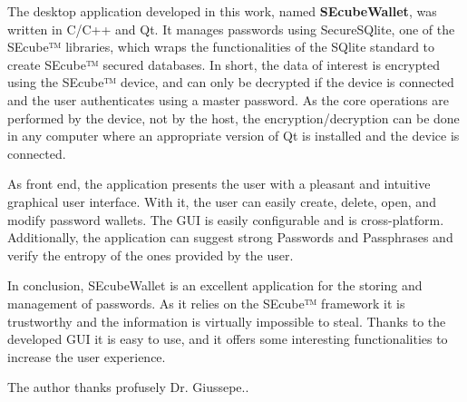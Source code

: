 \documentclass[%
    corpo=13pt,
    twoside,
    oldstyle,
    autoretitolo,
    greek,
    evenboxes,
    numerazioneromana,
    tipotesi=magistrale,
]{toptesi}
\begin{document}
The desktop application developed in this work, named \textbf{SEcubeWallet}, was written in C/C++ and Qt. 
It manages passwords using SecureSQlite, one of the SEcube™ libraries, which wraps the functionalities of the SQlite standard to create SEcube™ secured databases. In short, the data of interest is encrypted using the SEcube™ device, and can only be decrypted if the device is connected and the user authenticates using a master password. 
As the core operations are performed by the device, not by the host, the encryption/decryption can be done in any computer where an appropriate version of Qt is installed and the device is connected.

As front end, the application presents the user with a pleasant and intuitive graphical user interface. With it, the user can easily create, delete, open, and modify password wallets. The GUI is easily configurable and is cross-platform.
Additionally, the application can suggest strong Passwords and Passphrases and verify the entropy of the ones provided by the user.

In conclusion, SEcubeWallet is an excellent application for the storing and management of passwords. As it relies on the SEcube™ framework it is trustworthy and the information is virtually impossible to steal. Thanks to the developed GUI it is easy to use, and it offers some interesting functionalities to increase the user experience.



\ringraziamenti
The author thanks profusely Dr. Giussepe..

\indici

\listoffigures
\listoftables
\lstlistoflistings

\mainmatter








\end{document}
